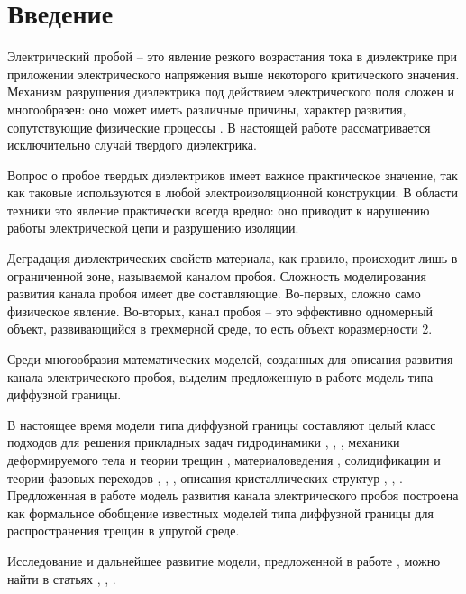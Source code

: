 
\section{Введение}

Электрический пробой -- это явление резкого возрастания тока в диэлектрике при приложении электрического напряжения выше некоторого критического значения. Механизм разрушения диэлектрика под действием электрического поля сложен и многообразен: оно может иметь различные причины, характер развития, сопутствующие физические процессы \cite{vorobiev_dielectric_physics}. В настоящей работе рассматривается исключительно случай твердого диэлектрика.

Вопрос о пробое твердых диэлектриков имеет важное практическое значение, так как таковые используются в любой электроизоляционной конструкции. В области техники это явление практически всегда вредно: оно приводит к нарушению работы электрической цепи и разрушению изоляции.

Деградация диэлектрических свойств материала, как правило, происходит лишь в ограниченной зоне, называемой каналом пробоя. Сложность моделирования развития канала пробоя имеет две составляющие. Во-первых, сложно само физическое явление. Во-вторых, канал пробоя -- это эффективно одномерный объект, развивающийся в трехмерной среде, то есть объект коразмерности 2.

Среди многообразия математических моделей, созданных для описания развития канала электрического пробоя, выделим предложенную в работе \cite{pitike_dielectric_breakdown} модель типа диффузной границы.

В настоящее время модели типа диффузной границы составляют целый класс подходов для решения прикладных задач гидродинамики \cite{lamorgese_flow_modeling}, \cite{kim_fluid_flows}, \cite{xu_hydrodynamics}, механики деформируемого тела и теории трещин \cite{ambati_fracture}, материаловедения \cite{provatas_materials}, солидификации и теории фазовых переходов \cite{boettinger_solidification}, \cite{cartalade_phase_separation}, \cite{gransaly_solidification}, описания кристаллических структур \cite{emmerich_crystal}, \cite{asadi_crystal}, \cite{provatas_crystal}. Предложенная в работе \cite{pitike_dielectric_breakdown} модель развития канала электрического пробоя построена как формальное обобщение известных моделей типа диффузной границы для распространения трещин в упругой среде.

Исследование и дальнейшее развитие модели, предложенной в работе \cite{pitike_dielectric_breakdown}, можно найти в статьях \cite{zipunova_higher_codimension}, \cite{zipunova_conservative}, \cite{zipunova_thermomechanical}.

